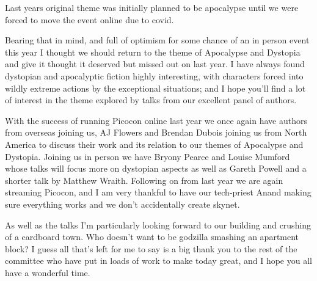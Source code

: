 Last years original theme was initially planned to be apocalypse until we were forced to move the event online due to covid.

Bearing that in mind, and full of optimism for some chance of an in person event this year I thought we should return to the theme of Apocalypse and Dystopia and give it thought it deserved but missed out on last year. I have always found dystopian and apocalyptic fiction highly interesting, with characters forced into wildly extreme actions by the exceptional situations; and I hope you’ll find a lot of interest in the theme explored by talks from our excellent panel of authors.

With the success of running Picocon online last year we once again have authors from overseas joining us, AJ Flowers and Brendan Dubois joining us from North America to discuss their work and its relation to our themes of Apocalypse and Dystopia. Joining us in person we have Bryony Pearce and Louise Mumford whose talks will focus more on dystopian aspects as well as Gareth Powell and a shorter talk by Matthew Wraith. Following on from last year we are again streaming Picocon, and I am very thankful to have our tech-priest Anand making sure everything works and we don’t accidentally create skynet.

As well as the talks I’m particularly looking forward to our building and crushing of a cardboard town. Who doesn’t want to be godzilla smashing an apartment block? I guess all that’s left for me to say is a big thank you to the rest of the committee who have put in loads of work to make today great, and I hope you all have a wonderful time.

